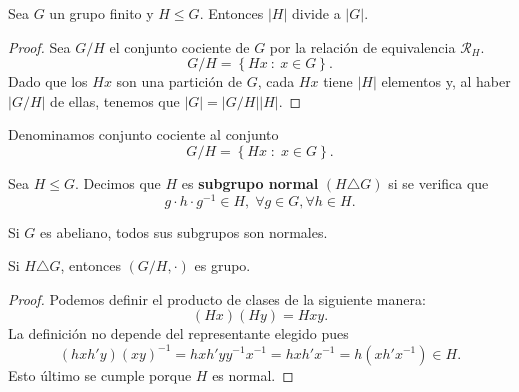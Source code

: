 \begin{ftheorem}
\normalfont Sea $\displaystyle G $ un grupo finito y $\displaystyle H \leq G $. Entonces $\displaystyle \left|H\right| $ divide a $\displaystyle \left|G\right| $.
\end{ftheorem}

\begin{proof}
Sea $\displaystyle G/H $ el conjunto cociente de $\displaystyle G $ por la relación de equivalencia $\displaystyle \mathcal{R}_{H} $. 
\[G/H = \left\{ Hx \: : \: x \in G\right\}  .\]
Dado que los $\displaystyle Hx $ son una partición de $\displaystyle G $, cada $\displaystyle Hx $ tiene $\displaystyle \left|H\right| $ elementos y, al haber $\displaystyle \left|G/H\right| $ de ellas, tenemos que $\displaystyle \left|G\right| = \left|G/H\right| \left|H\right| $.
\end{proof}

\begin{fdefinition}
\normalfont Denominamos conjunto cociente al conjunto
\[G/H = \left\{ Hx \; : \; x \in G\right\}  .\]
\end{fdefinition}

\begin{fdefinition}
\normalfont Sea $\displaystyle H \leq G $. Decimos que $\displaystyle H $ es \textbf{ subgrupo normal} $\displaystyle \left(H \triangle G\right) $ si se verifica que 
\[g \cdot h \cdot g^{-1} \in H, \; \forall g \in G, \forall h \in H .\]
\end{fdefinition}

\begin{observation}
\normalfont Si $\displaystyle G $ es abeliano, todos sus subgrupos son normales.
\end{observation}

\begin{fprop}[]
\normalfont Si $\displaystyle H \triangle G $, entonces $\displaystyle \left(G/H, \cdot \right) $ es grupo.
\end{fprop}

\begin{proof}
Podemos definir el producto de clases de la siguiente manera:
\[\left(Hx\right)\left(Hy\right) = Hxy .\]
La definición no depende del representante elegido pues
\[\left(hxh'y\right)\left(xy\right)^{-1} = hxh'yy^{-1}x^{-1}=hxh'x^{-1}=h\left(xh'x^{-1}\right) \in H .\]
Esto último se cumple porque $\displaystyle H $ es normal.
\end{proof}

